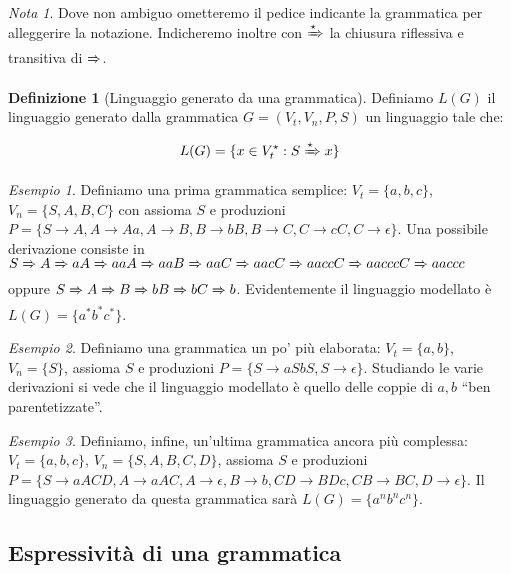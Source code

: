 \documentclass[a4paper,11pt,oneside]{article}
\theoremstyle{plain}
\theoremstyle{definition}
\newtheorem{defn}{Definizione}[section]
\theoremstyle{remark}
\newtheorem{esempio}{Esempio}[section]
\newtheorem*{nota}{Nota}
\newcommand*{\deriv}[1][]{\xRightarrow[#1]{}}
\newcommand*{\derivstar}[1][]{\xRightarrow[#1]{\star}}
\begin{document}
\begin{nota}
  Dove non ambiguo ometteremo il pedice indicante la grammatica per alleggerire
  la notazione. Indicheremo inoltre con $\derivstar$ la chiusura riflessiva
  e transitiva di $\deriv$.
\end{nota}

\begin{defn}[Linguaggio generato da una grammatica]\label{def:ling-gen-grammatica}
  Definiamo $L(G)$ il linguaggio generato dalla grammatica
  $G = (V_t, V_n, P, S)$ un linguaggio tale che:

  \begin{equation}
    L(G) = \{ x \in V_t^\star : S \derivstar x \}
  \end{equation}
\end{defn}

\begin{esempio}
  Definiamo una prima grammatica semplice: $V_t = \{a,b,c\}$, $V_n =
  \{S,A,B,C\}$ con assioma $S$ e produzioni $P = \{S \to A, A \to Aa, A \to B,
  B \to bB, B \to C, C \to cC, C \to \epsilon \}$. Una possibile derivazione
  consiste in $S \deriv A \deriv aA \deriv aaA \deriv aaB \deriv aaC \deriv aacC
  \deriv aaccC \deriv aacccC \deriv aaccc$ oppure $S \deriv A \deriv B \deriv bB
  \deriv bC \deriv b$. Evidentemente il linguaggio modellato è $L(G) =
  \{a^*b^*c^*\}$.
\end{esempio}

\begin{esempio}
  Definiamo una grammatica un po' più elaborata: $V_t = \{a,b\}$, $V_n = \{S\}$,
  assioma $S$ e produzioni $P = \{S \to aSbS, S \to \epsilon\}$. Studiando le
  varie derivazioni si vede che il linguaggio modellato è quello delle coppie di
  $a,b$ ``ben parentetizzate''.
\end{esempio}

\begin{esempio}
  Definiamo, infine, un'ultima grammatica ancora più complessa: $V_t =
  \{a,b,c\}$, $V_n = \{S,A,B,C,D\}$, assioma $S$ e produzioni
  $P = \{S \to aACD, A \to aAC, A \to \epsilon, B \to b, CD \to BDc, CB \to BC,
  D \to \epsilon\}$. Il linguaggio generato da questa grammatica sarà $L(G) =
  \{a^n b^n c^n \}$.
\end{esempio}

\subsection{Espressività di una grammatica}\label{sec:espressivita-grammatica}
\end{document}
